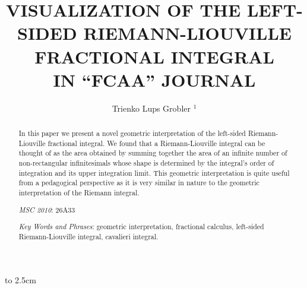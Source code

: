 \documentclass[twoside,reqno,11pt]{fcaa-var} %
\title[VISUALIZATION OF FRACTIONAL INTEGRALS]{VISUALIZATION OF THE LEFT-SIDED RIEMANN-LIOUVILLE FRACTIONAL INTEGRAL \\ [3pt] IN ``FCAA'' JOURNAL}
\author[\normalsize T.L Grobler]{\normalsize Trienko Lups Grobler $^1$}
\begin{document}
 \vbox to 2.5cm { \vfill }


 \bigskip \medskip

 \begin{abstract}In this paper we present a novel geometric interpretation of the left-sided Riemann-Liouville fractional integral. We found that a Riemann-Liouville integral can be thought of as the area obtained by summing together the area of an infinite number of non-rectangular infinitesimals whose shape is determined by the integral's order of integration and its upper integration limit. This geometric interpretation is quite useful from a pedagogical perspective as it is very similar
in nature to the geometric interpretation of the Riemann integral. 

 \medskip

{\it MSC 2010\/}: 26A33

 \smallskip

{\it Key Words and Phrases}: geometric interpretation, fractional calculus, left-sided Riemann-Liouville integral, cavalieri integral.


\end{abstract}

 \maketitle

 \vspace*{-16pt}

\end{document}
